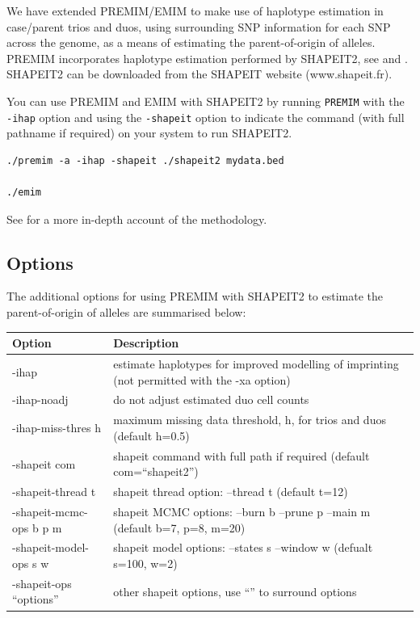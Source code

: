 \documentclass[a4paper,12pt]{article}
\newcommand{\code}[1]{{\footnotesize{{\tt #1}}}}
\begin{document}
We have extended PREMIM/EMIM to make use of haplotype estimation in case/parent trios and duos, using surrounding SNP information for each SNP across the genome, as a means of estimating the parent-of-origin of alleles. PREMIM incorporates haplotype estimation performed by SHAPEIT2, see \citet{delaneau:etal:12} and \citet{delaneau:etal:13}. SHAPEIT2 can be downloaded from the SHAPEIT website (www.shapeit.fr). 

You can use PREMIM and EMIM with SHAPEIT2 by running \code{PREMIM} with the \code{-ihap} option and using the \code{-shapeit} option to indicate the command (with full pathname if required) on your system to run SHAPEIT2. 
\vspace{0.35cm} \begin{lstlisting}
./premim -a -ihap -shapeit ./shapeit2 mydata.bed

./emim

\end{lstlisting} \vspace{0.35cm}
See \citet{howey:etal:15} for a more in-depth account of the methodology. 
\subsection{Options}
\label{options}

The additional options for using PREMIM with SHAPEIT2 to estimate the parent-of-origin of alleles are summarised below: 

{\begin{center}\begin{tabular}{ll}
Option  & Description\\
\hline
-ihap  & estimate haplotypes for improved modelling of imprinting (not permitted with the -xa option)\\
-ihap-noadj  & do not adjust estimated duo cell counts\\
-ihap-miss-thres h  & maximum missing data threshold, h, for trios and duos (default h=0.5)\\
-shapeit com  & shapeit command with full path if required (default com=``shapeit2'')\\
-shapeit-thread t  & shapeit thread option: --thread t (default t=12)\\
-shapeit-mcmc-ops b p m  & shapeit MCMC options: --burn b --prune p --main m (default b=7, p=8, m=20)\\
-shapeit-model-ops s w  & shapeit model options: --states s --window w (defualt s=100, w=2)\\
-shapeit-ops ``options''  & other shapeit options, use ``'' to surround options\\
\end{tabular}\end{center}}
\end{document}
